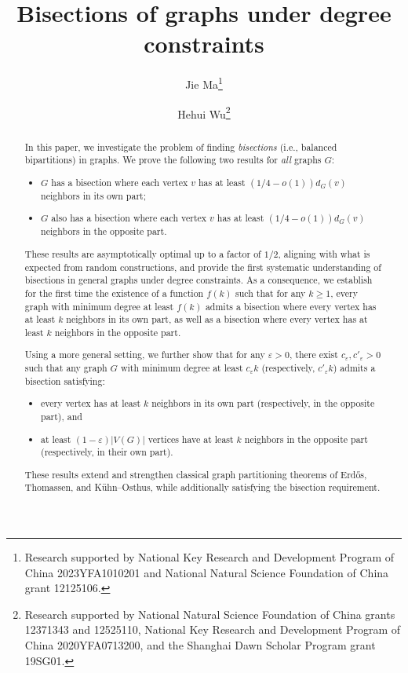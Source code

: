 \documentclass{aic}
\begin{document}
\begin{frontmatter}
\title{Bisections of graphs under degree constraints}
\date{}

\author[jie]{Jie Ma\thanks{Research supported by National Key Research and Development Program of China 2023YFA1010201 and National Natural Science Foundation of China grant 12125106.}}
\author[hehui]{Hehui Wu\thanks{Research supported by National Natural Science Foundation of China grants 12371343 and 12525110, National Key Research and Development Program of China 2020YFA0713200, and the Shanghai Dawn Scholar Program grant 19SG01.}}

\begin{abstract}
		In this paper, we investigate the problem of finding {\it bisections} (i.e., balanced bipartitions) in graphs.
		We prove the following two results for {\it all} graphs $G$:
		\begin{itemize}
			\item $G$ has a bisection where each vertex $v$ has at least $(1/4 -o(1))d_G(v)$ neighbors in its own part;
			\item $G$ also has a bisection where each vertex $v$ has at least $(1/4 -o(1))d_G(v)$ neighbors in the opposite part.
		\end{itemize}
		These results are asymptotically optimal up to a factor of $1/2$, aligning with what is expected from random constructions,
		and provide the first systematic understanding of bisections in general graphs under degree constraints.
		As a consequence, we establish for the first time the existence of a function $f(k)$ such that for any $k\geq 1$, every graph with minimum degree at least $f(k)$ admits a bisection where every vertex has at least $k$ neighbors in its own part,
		as well as a bisection where every vertex has at least $k$ neighbors in the opposite part.
		
		Using a more general setting, we further show that for any $\varepsilon > 0$, there exist $c_\varepsilon, c'_\varepsilon > 0$ such that any graph $G$ with minimum degree at least $c_\varepsilon k$ (respectively, $c'_\varepsilon k$) admits a bisection satisfying:
		\begin{itemize}
			\item every vertex has at least $k$ neighbors in its own part (respectively, in the opposite part), and
			\item at least $(1 - \varepsilon)|V(G)|$ vertices have at least $k$ neighbors in the opposite part (respectively, in their own part).
		\end{itemize}
		These results extend and strengthen classical graph partitioning theorems of Erd\H{o}s, Thomassen, and K\"{u}hn--Osthus, while additionally satisfying the bisection requirement.
	

\end{abstract}
\end{frontmatter}
\end{document}
